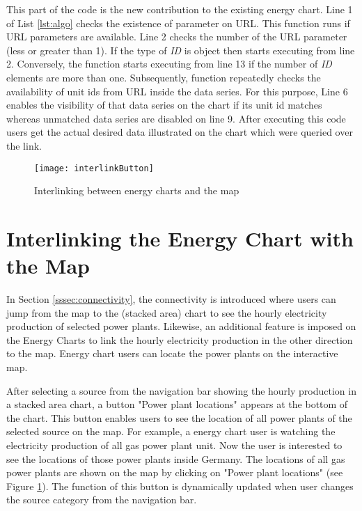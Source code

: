 This part of the code is the new contribution to the existing energy chart. Line 1 of List \ref{lst:algo} checks the existence of parameter on URL. This function runs if URL parameters are available. Line 2 checks the number of the URL parameter (less or greater than 1). If the type of \textit{ID} is object then starts executing from line 2. Conversely, the function starts executing from line 13 if the number of \textit{ID} elements are more than one. Subsequently, function repeatedly checks the availability of unit ids from URL inside the data series. For this purpose, Line 6 enables the visibility of that data series on the chart if its unit id matches whereas unmatched data series are disabled on line 9. After executing this code users get the actual desired data illustrated on the chart which were queried over the link.

\begin{figure} [h]
\centering
\texttt{[image: interlinkButton]}
\caption{Interlinking between energy charts and the map}
\label{fig:interlink}
\end{figure}

\section{Interlinking the Energy Chart with the Map}

In Section \ref{sssec:connectivity}, the connectivity is introduced where users can jump from the map to the (stacked area) chart to see the hourly electricity production of selected power plants. Likewise, an additional feature is imposed on the Energy Charts to link the hourly electricity production in the other direction to the map. Energy chart users can locate the power plants on the interactive map.

After selecting a source from the navigation bar showing the hourly production in a stacked area chart, a button "Power plant locations" appears at the bottom of the chart. This button enables users to see the location of all power plants of the selected source on the map. For example, a energy chart user is watching the electricity production of all gas power plant unit. Now the user is interested to see the locations of those power plants inside Germany. The locations of all gas power plants are shown on the map by clicking on "Power plant locations" (see Figure \ref{fig:interlink}). The function of this button is dynamically updated when user changes the source category from the navigation bar. 


